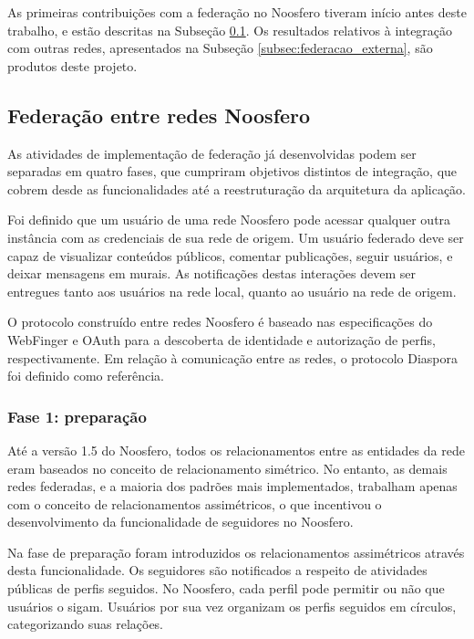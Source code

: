 As primeiras contribuições com a federação no Noosfero tiveram início antes deste
trabalho, e estão descritas na Subseção \ref{subsec:federacao_noosfero}. Os
resultados relativos à integração com outras redes, apresentados na Subseção
\ref{subsec:federacao_externa}, são produtos deste projeto.


\subsection{Federação entre redes Noosfero}
\label{subsec:federacao_noosfero}

As atividades de implementação de federação já desenvolvidas podem ser separadas em
quatro fases, que cumpriram objetivos distintos de integração, que cobrem desde as
funcionalidades até a reestruturação da arquitetura da aplicação.

Foi definido que um usuário de uma rede Noosfero pode acessar qualquer outra
instância com as credenciais de sua rede de origem. Um usuário federado deve ser
capaz de visualizar conteúdos públicos, comentar publicações, seguir usuários, e
deixar mensagens em murais. As notificações destas interações devem ser entregues
tanto aos usuários na rede local, quanto ao usuário na rede de origem.

O protocolo construído entre redes Noosfero é baseado nas especificações do
WebFinger e OAuth para a descoberta de identidade e autorização de perfis,
respectivamente. Em relação à comunicação entre as redes, o protocolo Diaspora foi
definido como referência.

\subsubsection{Fase 1: preparação}

Até a versão 1.5 do Noosfero, todos os relacionamentos entre as entidades da rede
eram baseados no conceito de relacionamento simétrico. No entanto, as demais redes
federadas, e a maioria dos padrões mais implementados, trabalham apenas com o
conceito de relacionamentos assimétricos, o que incentivou o desenvolvimento da
funcionalidade de seguidores no Noosfero.

Na fase de preparação foram introduzidos os relacionamentos assimétricos através
desta funcionalidade. Os seguidores são notificados a respeito de atividades
públicas de perfis seguidos. No Noosfero, cada perfil pode permitir ou não que
usuários o sigam. Usuários por sua vez organizam os perfis seguidos em círculos,
categorizando suas relações.

